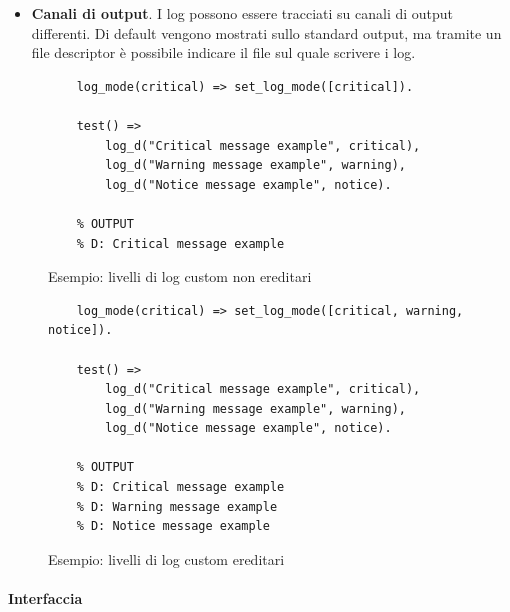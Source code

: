 \documentclass[12pt,a4paper,openright]{book}  %
\begin{document}
\begin{itemize}
	\item \textbf{Canali di output}. I log possono essere
          tracciati su canali di output differenti. Di default vengono
          mostrati sullo standard output, ma tramite un file
          descriptor è possibile indicare il file sul quale scrivere i
          log.
\end{itemize}

\begin{figure}
	\begin{verbatim}
	log_mode(critical) => set_log_mode([critical]).

	test() =>
	    log_d("Critical message example", critical),
	    log_d("Warning message example", warning),
	    log_d("Notice message example", notice).

	% OUTPUT
	% D: Critical message example

	\end{verbatim}

	\caption{Esempio: livelli di log custom non ereditari}
	\label{fig:example_loglevel_noinheritance}
\end{figure}

\begin{figure}
	\begin{verbatim}
	log_mode(critical) => set_log_mode([critical, warning, notice]).

	test() =>
	    log_d("Critical message example", critical),
	    log_d("Warning message example", warning),
	    log_d("Notice message example", notice).

	% OUTPUT
	% D: Critical message example
	% D: Warning message example
	% D: Notice message example
	\end{verbatim}
	\caption{Esempio: livelli di log custom ereditari}
	\label{fig:example_loglevel_inheritance}
\end{figure}

\paragraph{Interfaccia}
\end{document}
